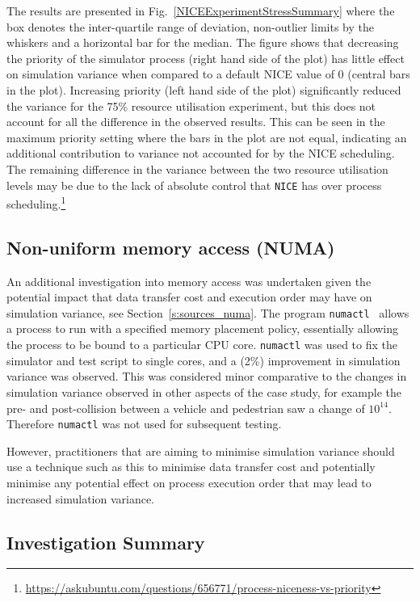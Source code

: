 \documentclass[runningheads,twocolumn,a4paper,10pt]{llncs}
\begin{document}
The results are presented in Fig.~\ref{NICEExperimentStressSummary} where the box denotes the inter-quartile range of deviation, non-outlier limits by the whiskers and a horizontal bar for the median. The figure shows that decreasing the priority of the simulator process (right hand side of the  plot) has little effect on simulation variance when compared to a default NICE value of 0 (central bars in the plot). Increasing priority (left hand side of the plot) significantly reduced the variance for the 75\% resource utilisation experiment, but this does not account for all the difference in the observed results. This can be seen in the maximum priority setting where the bars in the plot are not equal, indicating an additional contribution to variance not accounted for by the NICE scheduling. 
%
The remaining difference in the variance between the two resource utilisation levels may be due to the lack of absolute control that \texttt{NICE} has over process scheduling.\footnote{\url{https://askubuntu.com/questions/656771/process-niceness-vs-priority}}

\subsection{Non-uniform memory access (NUMA)} \label{r:numa}
An additional investigation into memory access was undertaken given the potential impact that data transfer cost and execution order may have on simulation variance, see Section~\ref{s:sources_numa}. %
The program \texttt{numactl}~\cite{numactl_NUMA} allows a process to run with a specified memory placement policy, essentially allowing the process to be bound to a particular CPU core. %
\texttt{numactl} was used to fix the simulator and test script to single cores, and a (2\%) improvement in simulation variance was observed. %
This was considered minor comparative to the changes in simulation variance observed in other aspects of the case study, for example the pre- and post-collision between a vehicle and pedestrian saw a change of $10^{14}$. Therefore \texttt{numactl} was not used for subsequent testing.

However, practitioners that are aiming to minimise simulation variance should use a technique such as this to minimise data transfer cost and potentially minimise any potential effect on process execution order that may lead to increased simulation variance. 


\subsection{Investigation Summary} \label{s:empirical_summary} 
\end{document}

